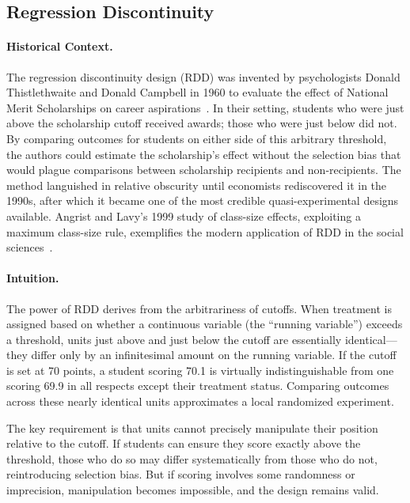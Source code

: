 \subsection{Regression Discontinuity}

\paragraph{Historical Context.}
The regression discontinuity design (RDD) was invented by psychologists Donald Thistlethwaite and Donald Campbell in 1960 to evaluate the effect of National Merit Scholarships on career aspirations~\cite{thistlethwaite1960regression}.
In their setting, students who were just above the scholarship cutoff received awards; those who were just below did not.
By comparing outcomes for students on either side of this arbitrary threshold, the authors could estimate the scholarship's effect without the selection bias that would plague comparisons between scholarship recipients and non-recipients.
The method languished in relative obscurity until economists rediscovered it in the 1990s, after which it became one of the most credible quasi-experimental designs available.
Angrist and Lavy's 1999 study of class-size effects, exploiting a maximum class-size rule, exemplifies the modern application of RDD in the social sciences~\cite{angrist1999using}.

\paragraph{Intuition.}
The power of RDD derives from the arbitrariness of cutoffs.
When treatment is assigned based on whether a continuous variable (the ``running variable'') exceeds a threshold, units just above and just below the cutoff are essentially identical---they differ only by an infinitesimal amount on the running variable.
If the cutoff is set at 70 points, a student scoring 70.1 is virtually indistinguishable from one scoring 69.9 in all respects except their treatment status.
Comparing outcomes across these nearly identical units approximates a local randomized experiment.

The key requirement is that units cannot precisely manipulate their position relative to the cutoff.
If students can ensure they score exactly above the threshold, those who do so may differ systematically from those who do not, reintroducing selection bias.
But if scoring involves some randomness or imprecision, manipulation becomes impossible, and the design remains valid.

